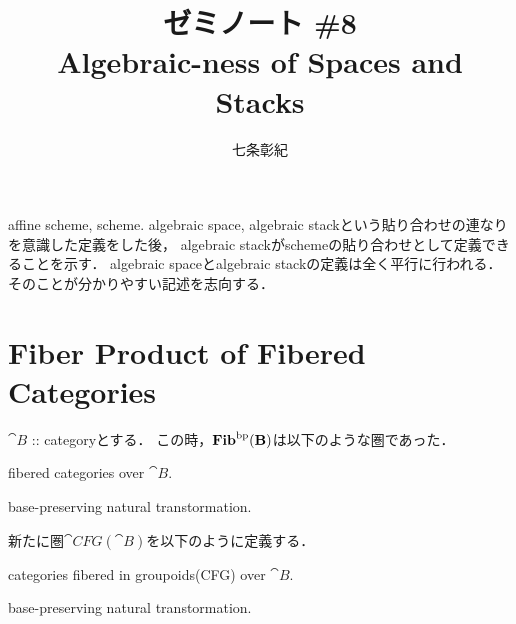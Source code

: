 \documentclass[a4paper, dvipdfmx]{jsarticle}
\newcommand{\CFG}[1]{\cat{CFG}(\cat{#1})}
\begin{document}
\title{ゼミノート \#8 \\ Algebraic-ness of Spaces and Stacks}
\author{七条彰紀}
\maketitle
affine scheme, scheme. algebraic space, algebraic stackという貼り合わせの連なりを意識した定義をした後，
algebraic stackがschemeの貼り合わせとして定義できることを示す．
algebraic spaceとalgebraic stackの定義は全く平行に行われる．
そのことが分かりやすい記述を志向する．

\section{Fiber Product of Fibered Categories}
    $\cat{B}$ :: categoryとする．
    この時，$\mathbf{Fib}^{\mathrm{bp}}(\mathbf{B})$は以下のような圏であった．
    \begin{description}[labelindent=1cm]
        \item[Objects:] fibered categories over $\cat{B}$.
        \item[Arrows:]  base-preserving natural transtormation.
    \end{description}
    新たに圏$\CFG{B}$を以下のように定義する．
    \begin{description}[labelindent=1cm]
        \item[Objects:] categories fibered in groupoids(CFG) over $\cat{B}$.
        \item[Arrows:] base-preserving natural transtormation.
    \end{description}
\end{document}
